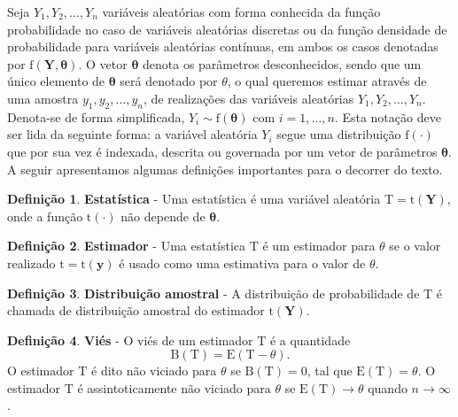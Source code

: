 \documentclass[
  9pt,
  a5paper,
]{book}
\theoremstyle{definition}
\newtheorem{definition}{Definição}[chapter]
\theoremstyle{definition}
\theoremstyle{definition}
\theoremstyle{definition}
\theoremstyle{remark}
\begin{document}
Seja \(Y_1, Y_2, \ldots, Y_n\) variáveis aleatórias com forma conhecida da
função probabilidade no caso de variáveis aleatórias discretas ou
da função densidade de probabilidade para variáveis aleatórias contínuas, em ambos os casos denotadas por \(\mathrm{f}(\mathbf{Y}, \boldsymbol{\theta})\).
O vetor \(\boldsymbol{\theta}\) denota os parâmetros desconhecidos, sendo que um único elemento de \(\boldsymbol{\theta}\) será denotado por \(\theta\), o qual queremos estimar através de uma
amostra \(y_1, y_2, \ldots, y_n\), de realizações das variáveis aleatórias \(Y_1, Y_2, \ldots, Y_n\). Denota-se de forma simplificada, \(Y_i \sim \mathrm{f}(\boldsymbol{\theta})\) com \(i = 1, \ldots, n\). Esta notação deve ser lida da seguinte forma: a variável aleatória \(Y_i\) segue uma distribuição \(\mathrm{f(\cdot)}\) que por sua vez é indexada, descrita ou governada por um vetor de parâmetros \(\boldsymbol{\theta}\). A seguir apresentamos algumas definições importantes para o decorrer do texto.

\begin{definition}
\protect\hypertarget{def:unnamed-chunk-5}{}\label{def:unnamed-chunk-5}\textbf{Estatística} - Uma estatística é uma variável aleatória \(\mathrm{T} = \mathrm{t}(\mathbf{Y})\), onde a função \(\mathrm{t}(\cdot)\) não depende de \(\boldsymbol{\theta}\).
\end{definition}

\begin{definition}
\protect\hypertarget{def:unnamed-chunk-6}{}\label{def:unnamed-chunk-6}\textbf{Estimador} - Uma estatística \(\mathrm{T}\) é um estimador para \(\theta\) se o valor realizado \(\mathrm{t} = \mathrm{t}(\boldsymbol{y})\) é usado como uma estimativa para o valor de \(\theta\).
\end{definition}

\begin{definition}
\protect\hypertarget{def:unnamed-chunk-7}{}\label{def:unnamed-chunk-7}\textbf{Distribuição amostral} - A distribuição de probabilidade de \(\mathrm{T}\) é chamada de distribuição amostral do estimador \(\mathrm{t}(\mathbf{Y})\).
\end{definition}

\begin{definition}
\protect\hypertarget{def:unnamed-chunk-8}{}\label{def:unnamed-chunk-8}\textbf{Viés} - O viés de um estimador \(\mathrm{T}\) é a quantidade \[\mathrm{B}(\mathrm{T}) = \mathrm{E}(\mathrm{T} - \theta).\] O estimador \(\mathrm{T}\) é dito não viciado para \(\theta\) se \(\mathrm{B}(\mathrm{T}) = 0\), tal que \(\mathrm{E}(\mathrm{T}) = \theta\). O estimador \(\mathrm{T}\) é assintoticamente não viciado para \(\theta\) se \(\mathrm{E}(\mathrm{T}) \to \theta\) quando \(n \to \infty\).
\end{definition}
\end{document}
